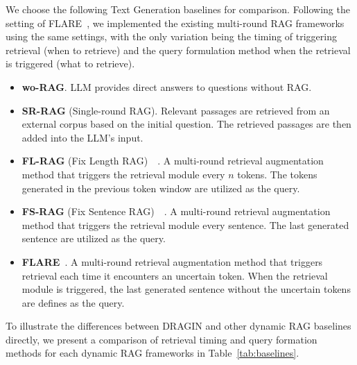 We choose the following Text Generation baselines for comparison. 
Following the setting of FLARE~\cite{jiang2023active}, we implemented the existing multi-round RAG frameworks using the same settings, with the only variation being the timing of triggering retrieval (when to retrieve) and the query formulation method when the retrieval is triggered (what to retrieve).

\begin{itemize}[leftmargin=*]

\item  \textbf{wo-RAG}. LLM provides direct answers to questions without RAG.
\item  \textbf{SR-RAG} ({Single-round RAG}). Relevant passages are retrieved from an external corpus based on the initial question. The retrieved passages are then added into the LLM's input.
\item  \textbf{FL-RAG} ({F}ix {L}ength RAG)~~\cite{khandelwal2019generalization, borgeaud2022improving,ram2023context}. A multi-round retrieval augmentation method that triggers the retrieval module every $n$ tokens. The tokens generated in the previous token window are utilized as the query.
\item  \textbf{FS-RAG} ({F}ix {S}entence RAG)~~\cite{trivedi2022interleaving}. A multi-round retrieval augmentation method that triggers the retrieval module every sentence. The last generated sentence are utilized as the query.
\item \textbf{FLARE}~\cite{jiang2023active}. A multi-round retrieval augmentation method that triggers retrieval each time it encounters an uncertain token. When the retrieval module is triggered, the last generated sentence without the uncertain tokens are defines as the query.

\end{itemize}

To illustrate the differences between DRAGIN and other dynamic RAG baselines directly, we present a comparison of retrieval timing and query formation methods for each dynamic RAG frameworks in Table~\ref{tab:baselines}.


